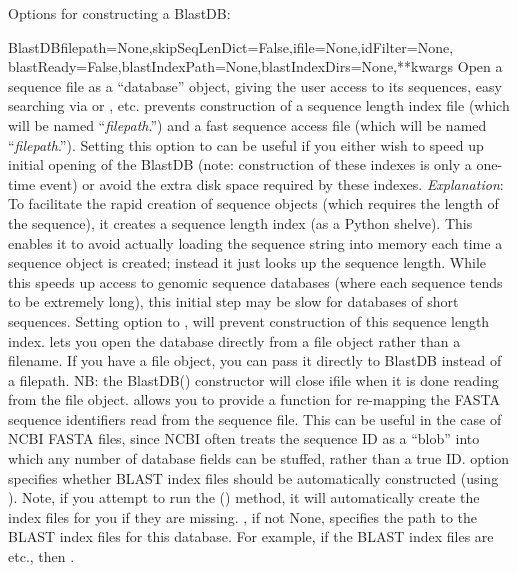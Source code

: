 \documentclass{howto}
\begin{document}
Options for constructing a BlastDB:

\begin{funcdesc}{BlastDB}{filepath=None,skipSeqLenDict=False,ifile=None,idFilter=None,
                 blastReady=False,blastIndexPath=None,blastIndexDirs=None,**kwargs}
  Open a sequence file as a ``database'' object, giving the user access to its sequences,
  easy searching via  or , etc.
   prevents construction of a sequence length index file 
  (which will be named ``{\em filepath}.'') and a fast
  sequence access file (which will be named ``{\em filepath}.'').
  Setting this option to  can be useful if you either wish to
  speed up initial opening of the BlastDB (note: construction of these indexes is
  only a one-time event) or avoid the extra disk space required by these indexes.
  {\em Explanation}: To facilitate the rapid creation of sequence objects (which requires the length of the sequence), it creates a sequence length index (as a Python shelve).  This enables it to avoid actually loading the sequence string into memory each time a sequence object is created; instead it just looks up the sequence length.  While this speeds up access to genomic sequence databases (where each sequence tends to be extremely long), this initial step may be slow for databases of short sequences.  Setting  option to , will prevent construction of this sequence length index.
   lets you open the database directly from a file object rather
  than a filename.  If you have a file object, you can pass it directly to BlastDB instead of a filepath.  NB: the BlastDB() constructor will close ifile when it is done reading from the file object.
   allows you to provide a function for re-mapping the FASTA sequence
  identifiers read from the sequence file.  This can be useful in the case of
  NCBI FASTA files, since NCBI often treats the sequence ID as a ``blob'' into
  which any number of database fields can be stuffed, rather than a true ID.
   option specifies whether BLAST index files should be automatically
  constructed (using ).  Note, if you attempt to run the ()
  method, it will automatically create the index files for you if they are missing.
  , if not None, specifies the path to the BLAST index
  files for this database.  For example, if the BLAST index files are
   etc., then .

\end{funcdesc}
\end{document}
